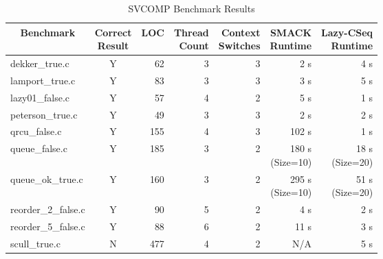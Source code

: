 \begin{table}[h,center]
\centering
\caption{SVCOMP Benchmark Results}\label{table:benchmarkresults}
\begin{tabular}{|l|c|r|r|r|r|r|}
\hline 
\multicolumn{1}{|c|}{\bfseries{Benchmark}} & 
 \specialcell{c}{\bfseries{Correct}\\\bfseries{Result}} &
 \multicolumn{1}{c|}{\bfseries{LOC}} &
 \specialcell{c}{\bfseries{Thread}\\\bfseries{Count}} & 
 \specialcell{c}{\bfseries{Context}\\\bfseries{Switches}} &
 \specialcell{c}{\bfseries{SMACK}\\\bfseries{Runtime}} &
 \specialcell{c}{\bfseries{Lazy-CSeq}\\\bfseries{Runtime}} \\
\hline
dekker\_true.c             & Y & 62  & 3       & 3            & 2 s             & 4 s            \\
\hline
lamport\_true.c            & Y & 83  & 3       & 3            & 3 s             & 5 s            \\
\hline
lazy01\_false.c            & Y & 57  & 4       & 2            & 5 s             & 1 s            \\
\hline
peterson\_true.c           & Y & 49  & 3       & 3            & 2 s             & 2 s            \\
\hline
qrcu\_false.c              & Y & 155 & 4       & 3            & 102 s           & 1 s            \\
\hline
queue\_false.c             & Y & 185 & 3       & 2            & \specialcell[c]{r}{180 s\\(Size=10)} &
                                                                \specialcell[c]{r}{18 s\\(Size=20)} \\
\hline
queue\_ok\_true.c          & Y & 160 & 3       & 2            & \specialcell[c]{r}{295 s\\(Size=10)} &
                                                                \specialcell[c]{r}{51 s\\(Size=20)} \\
\hline
reorder\_2\_false.c        & Y & 90  & 5       & 2            & 4 s             & 2 s            \\
\hline
reorder\_5\_false.c        & Y & 88  & 6       & 2            & 11 s            & 3 s            \\
\hline
scull\_true.c              & N & 477 & 4       & 2            & N/A             & 5 s            \\

\end{tabular}
\end{table}
